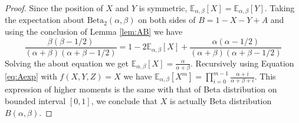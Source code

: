 \documentclass{elsarticle}
\def\E{\mathbb{E}}
\def\Beta{\textrm{Beta}}
\begin{document}
\begin{proof}
	Since the position of $X$ and $Y$ is symmetric,
	$\E_{\alpha, \beta}[X]=\E_{\alpha, \beta}[Y]$.
	Taking the expectation about $\Beta_2(\alpha, \beta)$
	on both sides of $B=1-X-Y+A$ and using the
	conclusion of Lemma \ref{lem:AB} we have
	\begin{equation*}
	\frac{\beta(\beta-1/2)}{(\alpha+\beta)(\alpha+\beta-1/2)}
	= 1 - 2\E_{\alpha, \beta}[X] +
	\frac{\alpha(\alpha-1/2)}{(\alpha+\beta)(\alpha+\beta-1/2)}
	\end{equation*}
	Solving the about equation we get
	$\E_{\alpha, \beta}[X]=\frac{\alpha}{\alpha + \beta}$.
	Recursively using Equation \eqref{eq:Aexp} with $f(X,Y,Z)=X$
	we have $\E_{\alpha, \beta}[X^m] =
	\prod_{i=0}^{m-1}\frac{\alpha+i}{\alpha+\beta+i}$.
	This expression of higher moments
	is the same with that of Beta distribution on bounded interval $[0,1]$, we
	conclude that $X$ is actually Beta distribution $B(\alpha,
	\beta)$.
\end{proof}
\end{document}
